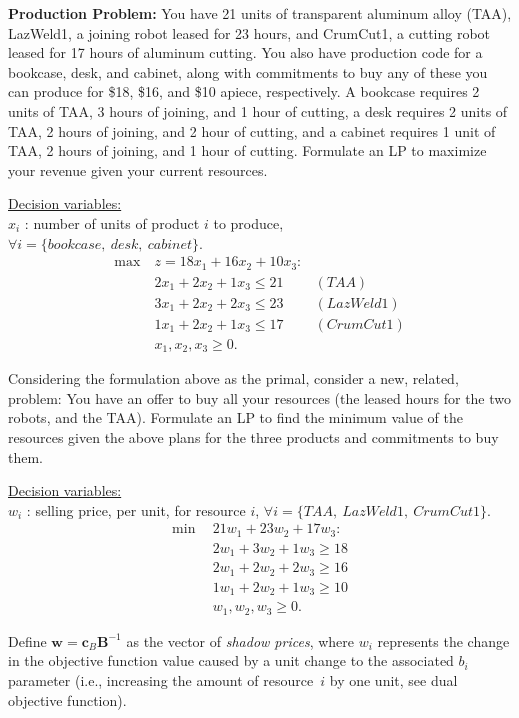 {\bf Production Problem:} You have 21 units of transparent aluminum alloy (TAA), LazWeld1, a joining robot leased for 23 hours, and CrumCut1, a cutting robot leased for 17 hours of aluminum cutting. You also have production code for a bookcase, desk, and cabinet, along with commitments to buy any of these you can produce for \$18,  \$16, and  \$10 apiece, respectively.  A bookcase requires 2 units of TAA, 3 hours of joining, and 1 hour of cutting, a desk requires 2 units of TAA, 2 hours of joining, and 2 hour of cutting, and a cabinet requires 1 unit of TAA, 2 hours of joining, and 1 hour of cutting. Formulate an LP to maximize your revenue given your current resources.

\medskip \underline{Decision variables:} \\
$x_i$ : number of units of product $i$ to produce, \\
$\forall i = \{bookcase,~desk,~cabinet\}$.
\begin{align*}
\max~& z = 18x_1 + 16x_2 + 10x_3 :  \\
& 2x_1 + 2x_2 + 1x_3 \le 21 & (TAA) \\
& 3x_1 + 2x_2 + 2x_3 \le 23 & (LazWeld1) \\
&  1x_1 + 2x_2 + 1x_3 \le 17 & (CrumCut1)  \\
& x_1, x_2, x_3 \ge 0.
\end{align*}

Considering the formulation above as the primal, consider a new, related, problem: You have an offer to buy all your resources (the leased hours for the two robots, and the TAA).  Formulate an LP to find the minimum value of the resources given the above plans for the three products and commitments to buy them.

\medskip \underline{Decision variables:} \\
$w_i$ : selling price, per unit, for resource $i$, $\forall i = \{TAA,~ LazWeld1,~CrumCut1\}$.
\begin{align*}
\min~~& 21w_1 +23w_2 +17w_3:  \\
&  2w_1 +3w_2 + 1w_3 \ge 18  \\
& 2w_1 +2w_2 + 2w_3 \ge 16 \\
& 1w_1 +2w_2 + 1w_3 \ge 10 \\
& w_1, w_2, w_3 \ge 0. 
\end{align*}


Define $\mathbf{w}=\mathbf{c}_B\mathbf{B}^{-1}$ as the vector of {\it shadow prices}, where $w_i$ represents the change in the objective function value caused by a unit change to the associated $b_i$ parameter (i.e., increasing the amount of resource~$i$ by one unit, see dual objective function). \\

